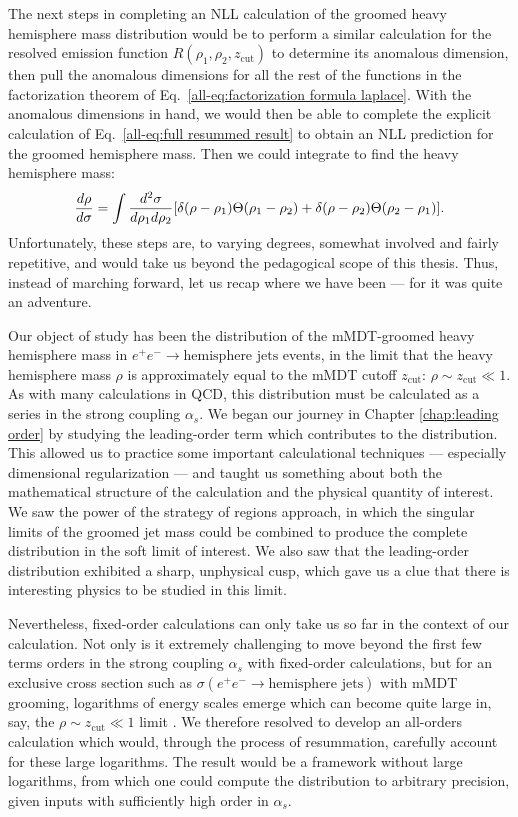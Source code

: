 \documentclass[../thesis.tex]{subfiles}
\providecommand{\zcut}{z_\mathrm{{cut}}}
\begin{document}
	The next steps in completing an NLL calculation of the groomed heavy hemisphere mass distribution would be to perform a similar calculation for the resolved emission function $R(\rho_1, \rho_2, \zcut)$ to determine its anomalous dimension, then pull the anomalous dimensions for all the rest of the functions in the factorization theorem of Eq.~\ref{all-eq:factorization formula laplace}. With the anomalous dimensions in hand, we would then be able to complete the explicit calculation of Eq.~\ref{all-eq:full resummed result} to obtain an NLL prediction for the groomed hemisphere mass. Then we could integrate to find the heavy hemisphere mass:
	\begin{equation}
		\frac{d\rho}{d\sigma} = \int \frac{d^2\sigma}{d\rho_1 d\rho_2}\qty[\delta(\rho - \rho_1)\Theta(\rho_1 - \rho_2) + \delta(\rho - \rho_2)\Theta(\rho_2 - \rho_1)].
	\end{equation}
	Unfortunately, these steps are, to varying degrees, somewhat involved and fairly repetitive, and would take us beyond the pedagogical scope of this thesis. Thus, instead of marching forward, let us recap where we have been --- for it was quite an adventure.

	Our object of study has been the distribution of the mMDT-groomed heavy hemisphere mass in $e^+ e^- \to \text{hemisphere jets}$ events, in the limit that the heavy hemisphere mass $\rho$ is approximately equal to the mMDT cutoff $\zcut$: $\rho \sim \zcut \ll 1$. As with many calculations in QCD, this distribution must be calculated as a series in the strong coupling $\alpha_s$. We began our journey in Chapter \ref{chap:leading order} by studying the leading-order term which contributes to the distribution. This allowed us to practice some important calculational techniques --- especially dimensional regularization --- and taught us something about both the mathematical structure of the calculation and the physical quantity of interest. We saw the power of the strategy of regions approach, in which the singular limits of the groomed jet mass could be combined to produce the complete distribution in the soft limit of interest. We also saw that the leading-order distribution exhibited a sharp, unphysical cusp, which gave us a clue that there is interesting physics to be studied in this limit.

	Nevertheless, fixed-order calculations can only take us so far in the context of our calculation. Not only is it extremely challenging to move beyond the first few terms orders in the strong coupling $\alpha_s$ with fixed-order calculations, but for an exclusive cross section such as $\sigma(e^+ e^- \to \text{hemisphere jets})$ with mMDT grooming, logarithms of energy scales emerge which can become quite large in, say, the $\rho \sim \zcut \ll 1$ limit \cite{larkoski_elementary_2019-1}. We therefore resolved to develop an all-orders calculation which would, through the process of resummation, carefully account for these large logarithms. The result would be a framework without large logarithms, from which one could compute the distribution to arbitrary precision, given inputs with sufficiently high order in $\alpha_s$.
\end{document}
